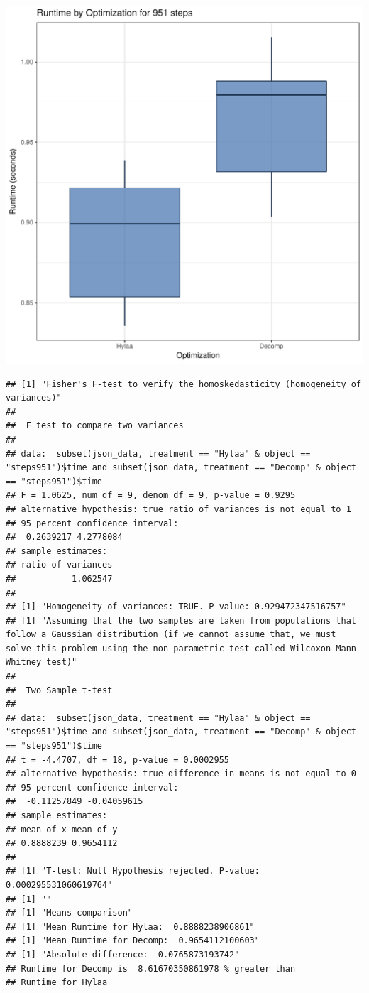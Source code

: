 \documentclass{article}\usepackage[]{graphicx}\usepackage[]{color}
\makeatletter
\def\maxwidth{ %
  \ifdim\Gin@nat@width>\linewidth
    \linewidth
  \else
    \Gin@nat@width
  \fi
}
\newenvironment{kframe}{%
 \def\at@end@of@kframe{}%
 \ifinner\ifhmode%
  \def\at@end@of@kframe{\end{minipage}}%
  \begin{minipage}{\columnwidth}%
 \fi\fi%
 \def\FrameCommand##1{\hskip\@totalleftmargin \hskip-\fboxsep
 \colorbox{shadecolor}{##1}\hskip-\fboxsep
     \hskip-\linewidth \hskip-\@totalleftmargin \hskip\columnwidth}%
 \MakeFramed {\advance\hsize-\width
   \@totalleftmargin\z@ \linewidth\hsize
   \@setminipage}}%
 {\par\unskip\endMakeFramed%
 \at@end@of@kframe}
\newenvironment{knitrout}{}{} %
\makeatother
\begin{document}
\begin{knitrout}
\color{fgcolor}
\includegraphics[width=\maxwidth]{figure/RH2_steps951-1} 
\begin{kframe}\begin{verbatim}
## [1] "Fisher's F-test to verify the homoskedasticity (homogeneity of variances)"
## 
## 	F test to compare two variances
## 
## data:  subset(json_data, treatment == "Hylaa" & object == "steps951")$time and subset(json_data, treatment == "Decomp" & object == "steps951")$time
## F = 1.0625, num df = 9, denom df = 9, p-value = 0.9295
## alternative hypothesis: true ratio of variances is not equal to 1
## 95 percent confidence interval:
##  0.2639217 4.2778084
## sample estimates:
## ratio of variances 
##           1.062547 
## 
## [1] "Homogeneity of variances: TRUE. P-value: 0.929472347516757"
## [1] "Assuming that the two samples are taken from populations that follow a Gaussian distribution (if we cannot assume that, we must solve this problem using the non-parametric test called Wilcoxon-Mann-Whitney test)"
## 
## 	Two Sample t-test
## 
## data:  subset(json_data, treatment == "Hylaa" & object == "steps951")$time and subset(json_data, treatment == "Decomp" & object == "steps951")$time
## t = -4.4707, df = 18, p-value = 0.0002955
## alternative hypothesis: true difference in means is not equal to 0
## 95 percent confidence interval:
##  -0.11257849 -0.04059615
## sample estimates:
## mean of x mean of y 
## 0.8888239 0.9654112 
## 
## [1] "T-test: Null Hypothesis rejected. P-value: 0.000295531060619764"
## [1] ""
## [1] "Means comparison"
## [1] "Mean Runtime for Hylaa:  0.8888238906861"
## [1] "Mean Runtime for Decomp:  0.9654112100603"
## [1] "Absolute difference:  0.0765873193742"
## Runtime for Decomp is  8.61670350861978 % greater than 
## Runtime for Hylaa
\end{verbatim}
\end{kframe}
\end{knitrout}
\end{document}
